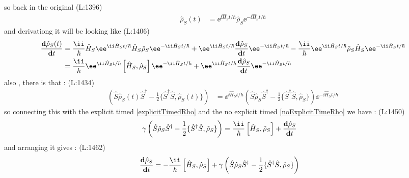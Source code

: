  so back in the original
(L:1396)
\begin{equation}
\begin{split}
\hat{\rho }_{S }(t )&=\ee ^{\ii \hat{H }_{S }t /\hbar }\hat{\rho }_{S }\ee ^{-\ii \hat{H }_{S }t /\hbar }\end{split}
\end{equation}
 and derivationg it will be looking like 
(L:1406)
\begin{equation}
\begin{split}
\dfrac{\bold{d}\hat{\rho }_{S }(t )}{\bold{d}t }&=\frac{\ii }{\hbar }\hat{H }_{S }\ee ^{\ii \hat{H }_{S }t /\hbar }\hat{H }_{S }\hat{\rho }_{S }\ee ^{-\ii \hat{H }_{S }t /\hbar }+\ee ^{\ii \hat{H }_{S }t /\hbar }\dfrac{\bold{d}\hat{\rho }_{S }}{\bold{d}t }\ee ^{-\ii \hat{H }_{S }t /\hbar }-\frac{\ii }{\hbar }\ee ^{\ii \hat{H }_{S }t /\hbar }\hat{\rho }_{S }\hat{H }_{S }\ee ^{-\ii \hat{H }_{S }t /\hbar }\\
&=\frac{\ii }{\hbar }\ee ^{\ii \hat{H }_{S }t /\hbar }\left[\hat{H }_{S },\hat{\rho }_{S }\right]\ee ^{-\ii \hat{H }_{S }t /\hbar }+\ee ^{\ii \hat{H }_{S }t /\hbar }\dfrac{\bold{d}\hat{\rho }_{S }}{\bold{d}t }\ee ^{-\ii \hat{H }_{S }t /\hbar }\end{split}
\end{equation}
 also , there  is that : 
(L:1434)
\begin{equation}
\begin{split}
\label{noExplicitTimeRho}\left(\hat{S }\hat{\rho }_{S }(t )\hat{S }^\dagger -\frac{1}{2}\{\hat{S }^\dagger \hat{S },\hat{\rho }_{S }(t )\}\right)&=\ee ^{\ii \hat{H }_{S }t /\hbar }\left(\hat{S }\hat{\rho }_{S }\hat{S }^\dagger -\frac{1}{2}\{\hat{S }^\dagger \hat{S },\hat{\rho }_{S }\}\right)\ee ^{-\ii \hat{H }_{S }t /\hbar }\end{split}
\end{equation}
 so connecting this with the explicit timed \eqref{explicitTimedRho} 
 and the no explicit timed \eqref{noExplicitTimeRho}
 we have : 
(L:1450)
\begin{equation}
\begin{split}
\gamma \left(\hat{S }\hat{\rho }_{S }\hat{S }^\dagger -\frac{1}{2}\{\hat{S }^\dagger \hat{S },\hat{\rho }_{S }\}\right)&=\frac{\ii }{\hbar }\left[\hat{H }_{S },\hat{\rho }_{S }\right]+\dfrac{\bold{d}\hat{\rho }_{S }}{\bold{d}t }\end{split}
\end{equation}
 and arranging it gives : 
(L:1462)
\begin{equation}
\begin{split}
\dfrac{\bold{d}\hat{\rho }_{S }}{\bold{d}t }&=-\frac{\ii }{\hbar }\left[\hat{H }_{S },\hat{\rho }_{S }\right]+\gamma \left(\hat{S }\hat{\rho }_{S }\hat{S }^\dagger -\frac{1}{2}\{\hat{S }^\dagger \hat{S },\hat{\rho }_{S }\}\right)\end{split}
\end{equation}
